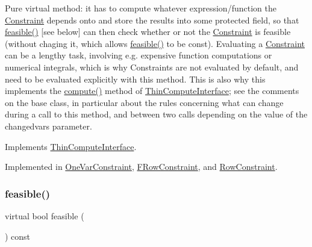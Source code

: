 Pure virtual method\+: it has to compute whatever expression/function the \mbox{\hyperlink{class_s_m_spp__di__unipi__it_1_1_constraint}{Constraint}} depends onto and store the results into some protected field, so that \mbox{\hyperlink{class_s_m_spp__di__unipi__it_1_1_constraint_a29e571bbd4e2f1046c56e39c06633c4c}{feasible()}} \mbox{[}see below\mbox{]} can then check whether or not the \mbox{\hyperlink{class_s_m_spp__di__unipi__it_1_1_constraint}{Constraint}} is feasible (without chaging it, which allows \mbox{\hyperlink{class_s_m_spp__di__unipi__it_1_1_constraint_a29e571bbd4e2f1046c56e39c06633c4c}{feasible()}} to be const). Evaluating a \mbox{\hyperlink{class_s_m_spp__di__unipi__it_1_1_constraint}{Constraint}} can be a lengthy task, involving e.\+g. expensive function computations or numerical integrals, which is why Constraints are not evaluated by default, and need to be evaluated explicitly with this method. This is also why this implements the \mbox{\hyperlink{class_s_m_spp__di__unipi__it_1_1_constraint_a504d4e3e174c7a518cc66156a8a45ce5}{compute()}} method of \mbox{\hyperlink{class_s_m_spp__di__unipi__it_1_1_thin_compute_interface}{Thin\+Compute\+Interface}}; see the comments on the base class, in particular about the rules concerning what can change during a call to this method, and between two calls depending on the value of the changedvars parameter. 

Implements \mbox{\hyperlink{class_s_m_spp__di__unipi__it_1_1_thin_compute_interface_a00fd6363d98ea46bcc273842b327d050}{Thin\+Compute\+Interface}}.



Implemented in \mbox{\hyperlink{class_s_m_spp__di__unipi__it_1_1_one_var_constraint_afc8ff54ab05d22f4cca0fb0bfbeb7a49}{One\+Var\+Constraint}}, \mbox{\hyperlink{class_s_m_spp__di__unipi__it_1_1_f_row_constraint_afc8ff54ab05d22f4cca0fb0bfbeb7a49}{F\+Row\+Constraint}}, and \mbox{\hyperlink{class_s_m_spp__di__unipi__it_1_1_row_constraint_a504d4e3e174c7a518cc66156a8a45ce5}{Row\+Constraint}}.

\mbox{\label{class_s_m_spp__di__unipi__it_1_1_constraint_a29e571bbd4e2f1046c56e39c06633c4c}} 
\subsubsection{\texorpdfstring{feasible()}{feasible()}}
{\footnotesize\ttfamily virtual bool feasible (\begin{DoxyParamCaption}\item[{void}]{ }\end{DoxyParamCaption}) const\hspace{0.3cm}{\ttfamily [pure virtual]}}




